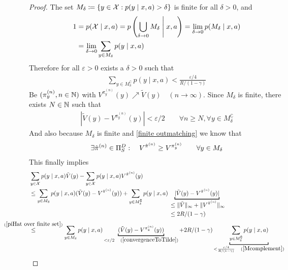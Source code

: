 \begin{proof}
	The set \(M_\delta\coloneqq \{y\in\mathcal{X} : p(y\mid x,a)>\delta \} \) is finite for all \(\delta>0\), and
	\begin{align*}
		1&=p(\mathcal{X}\mid x,a)=p\left(\bigcup_{\delta \to 0} M_\delta \;\middle|\; x, a \right)
		= \lim_{\delta\to 0} p(M_\delta\mid x,a) \\
		&=\lim_{\delta\to 0} \sum_{y\in M_\delta} p(y\mid x,a)
	\end{align*}
	Therefore for all \(\varepsilon >0\) exists a \(\delta>0\) such that
	\begin{align}
		\sum_{y\in M_\delta^\complement}p(y\mid x,a) < \frac{\varepsilon /4}{R/(1-\gamma)}
		\label{Mcomplement}
	\end{align}
	Be \((\pi_y^{(n)},n\in\mathbb{N} )\) with \(V^{\pi_y^{(n)}}(y) \nearrow \tilde{V}(y) \quad (n\to\infty) \). Since \(M_\delta\) is finite, there exists \(N\in\mathbb{N} \) such that
	\begin{align}
		|\tilde{V}(y) -V^{\pi_y^{(n)}}(y)|< \varepsilon/2
		\qquad \forall n\ge N, \forall y\in M_\delta^\complement
		\label{convergenceToTilde}
	\end{align}
	And also because \(M_\delta \) is finite and \ref{finite outmatching} we know that
	\begin{align}
	\exists\hat{\pi}^{(n)}\in\Pi_S^D : 
	\quad {V^{\hat{\pi}^{(n)}}\ge V^{\pi_y^{(n)}}}
	\qquad \forall y\in M_\delta
	\label{piHat over finite set}
	\end{align}
	This finally implies
	\begin{align*}
		&\sum_{y\in\cX}p(y\mid x,a)\tilde{V}(y) 
		- \sum_{y\in\cX}p(y\mid x,a) V^{\hat{\pi}^{(n)}}(y) \\
		&\le \sum_{y\in M_\delta}p(y\mid x,a) (\tilde{V}(y) - V^{\hat{\pi}^{(n)}}(y))
		+ \sum_{y\in M_\delta^\complement}p(y\mid x,a) 
		\underbracket[1pt]{|\tilde{V}(y) - V^{\hat{\pi}^{(n)}}(y)|}_{
			\begin{aligned}
				&\le \|\tilde{V}\|_\infty + \| V^{\hat{\pi}^{(n)}}\|_\infty\\
				&\le 2R/(1-\gamma)
			\end{aligned}
		} \\
		&\lxlq{(\ref{piHat over finite set})} \sum_{y\in M_\delta}p(y\mid x,a) 
		\underbracket[1pt]{(\tilde{V}(y) - V^{\pi_y^{(n)}}(y))}_{
			<\varepsilon/2\quad(\ref{convergenceToTilde})
		}
		+ 2R/(1-\gamma) \underbracket[1pt]{\sum_{y\in M_\delta^\complement}p(y\mid x,a)}_{
			< \frac{\varepsilon /4}{R/(1-\gamma)}\quad(\ref{Mcomplement})
		}\\

\end{align*}
\end{proof}
